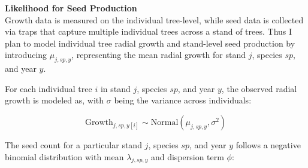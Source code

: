 \documentclass[11pt,letter]{article}
\begin{document}
\textbf{Likelihood for Seed Production}\\
Growth data is measured on the individual tree-level, while seed data is collected via traps that capture multiple individual trees across a stand of trees. Thus I plan to model individual tree radial growth and stand-level seed production by introducing \(\mu_{j,sp,y}\), representing the mean radial growth for stand \(j\), species \(sp\), and year \(y\). %

For each individual tree \(i\) in stand \(j\), species \(sp\), and year \(y\), the observed radial growth is modeled as, with $\sigma$ being the variance across individuals:

\[
\text{Growth}_{j,sp,y[i]} \sim \text{Normal}(\mu_{j,sp,y}, \sigma^2)
\]

The seed count for a particular stand \(j\), species \(sp\), and year \(y\) follows a negative binomial distribution with mean \(\lambda_{j,sp,y}\) and dispersion term \(\phi\):
\end{document}
